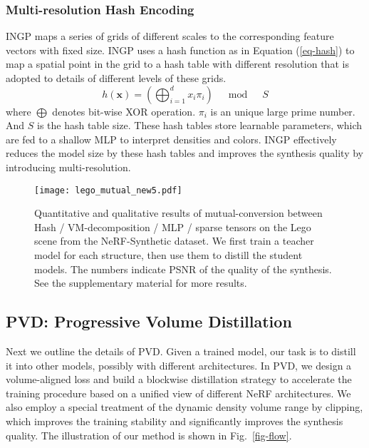 \documentclass[letterpaper]{article} \usepackage{aaai23}  \usepackage{times}  \usepackage{helvet}  \usepackage{courier}  \usepackage[hyphens]{url}  \usepackage{graphicx} \urlstyle{rm} \def\UrlFont{\rm}  \usepackage{natbib}  \usepackage{caption} \frenchspacing  \setlength{\pdfpagewidth}{8.5in}  \setlength{\pdfpageheight}{11in}  \usepackage{multirow}
\begin{document}
\subsubsection{Multi-resolution Hash Encoding}INGP \cite{muller2022instant} maps a series of grids of different scales to the corresponding feature vectors with fixed size. INGP uses a hash function as in Equation (\ref{eq-hash}) to map a spatial point in the grid to a hash table with different resolution that is adopted to details of different levels of these grids.
\begin{equation}  \label{eq-hash}
h(\mathbf{x})=\left(\bigoplus_{i=1}^{d} x_{i} \pi_{i}\right) \quad \bmod \quad S
\end{equation}
where $\bigoplus$ denotes bit-wise XOR operation. $\pi_{i}$ is an unique large prime number. And $S$ is the hash table size. These hash tables store learnable parameters, which are fed to a shallow MLP to interpret densities and colors. INGP effectively reduces the model size by these hash tables and improves the synthesis quality by introducing multi-resolution.


\begin{figure*}[t]
\centering
\texttt{[image: lego\_mutual\_new5.pdf]} \caption{Quantitative and qualitative results of mutual-conversion between Hash / VM-decomposition / MLP / sparse tensors on the Lego scene from the NeRF-Synthetic dataset. We first train a teacher model for each structure, then use them to distill the student models. The numbers indicate PSNR of the quality of the synthesis. See the supplementary material for more results.}
\label{fig-mutual}
\end{figure*}

\subsection{PVD: Progressive Volume Distillation}
Next we outline the details of PVD. Given a trained model, our task is to distill it into other models, possibly with different architectures. In PVD, we design a volume-aligned loss and build a blockwise distillation strategy to accelerate the training procedure based on a unified view of different NeRF architectures. We also employ a special treatment of the dynamic density volume range by clipping, which improves the training stability and significantly improves the synthesis quality.
The illustration of our method is shown in Fig.~\ref{fig-flow}.
\end{document}
